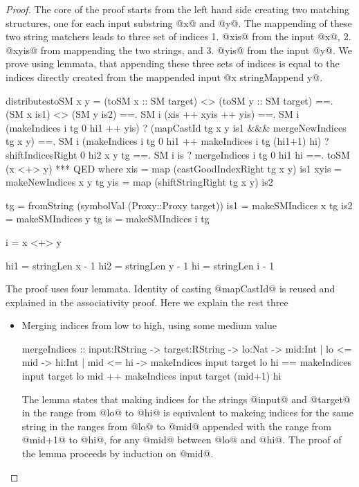 \begin{proof}
The core of the proof starts from the left hand side 
creating two matching structures, one for each input 
substring @x@ and @y@. 
%
The mappending of these two string matchers leads to 
three set of indices
1. @xis@ from the input @x@, 
2. @xyis@ from mappending the two strings, and
3. @yis@ from the input @y@.
%
We prove using lemmata, 
that appending these three sets of indices is equal to 
the indices directly created from the mappended input @x stringMappend y@.
\begin{code}
distributestoSM x y 
  =   (toSM x :: SM target) <> (toSM y :: SM target)  
  ==. (SM x is1) <> (SM y is2)
  ==. SM i (xis ++ xyis ++ yis)
  ==. SM i (makeIndices i tg 0 hi1 ++ yis) 
      ?  (mapCastId tg x y is1 
      &&& mergeNewIndices tg x y)
  ==. SM i (makeIndices i tg 0       hi1 
         ++ makeIndices i tg (hi1+1) hi) 
      ? shiftIndicesRight 0 hi2 x y tg 
  ==. SM i is
      ? mergeIndices i tg 0 hi1 hi
  ==. toSM (x <+> y)
  *** QED 
  where
    xis  = map (castGoodIndexRight tg x y) is1
    xyis = makeNewIndices x y tg
    yis  = map (shiftStringRight   tg x y) is2

    tg  = fromString (symbolVal (Proxy::Proxy target))
    is1 = makeSMIndices x tg 
    is2 = makeSMIndices y tg 
    is  = makeSMIndices i tg 

    i = x <+> y

    hi1 = stringLen x - 1
    hi2 = stringLen y - 1
    hi  = stringLen i - 1 
\end{code}
%
The proof uses four lemmata.
Identity of casting @mapCastId@
is reused and explained in the associativity proof. 
Here we explain the rest three
\begin{itemize}
\item Merging indices from low to high, using some medium value
\begin{code}
mergeIndices 
  :: input:RString -> target:RString 
  -> lo:Nat -> mid:{Int | lo <= mid} 
  -> hi:{Int | mid <= hi} 
  -> { makeIndices input target lo hi   == 
      makeIndices input target lo mid  ++ 
      makeIndices input target (mid+1) hi} 
\end{code}
The lemma states that making indices for the strings @input@ and @target@
in the range from @lo@ to @hi@
is equivalent to makeing indices for the same string in the ranges
from @lo@ to @mid@ appended with the range from @mid+1@ to @hi@, 
for any @mid@ between @lo@ and @hi@. 
%
The proof of the lemma proceeds by induction on @mid@.


\end{itemize}
\end{proof}
